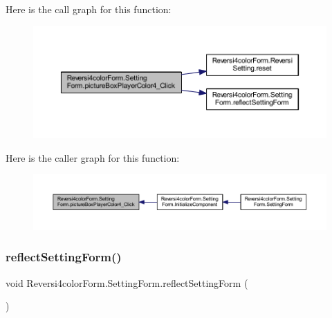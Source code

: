 Here is the call graph for this function\+:
\nopagebreak
\begin{figure}[H]
\begin{center}
\leavevmode
\includegraphics[width=350pt]{class_reversi4color_form_1_1_setting_form_ab63992b26a7b6709437689625b8a1143_cgraph}
\end{center}
\end{figure}
Here is the caller graph for this function\+:
\nopagebreak
\begin{figure}[H]
\begin{center}
\leavevmode
\includegraphics[width=350pt]{class_reversi4color_form_1_1_setting_form_ab63992b26a7b6709437689625b8a1143_icgraph}
\end{center}
\end{figure}
\mbox{\label{class_reversi4color_form_1_1_setting_form_a33a42eed1cef78b8906da8ff65874ecd}} 
\subsubsection{\texorpdfstring{reflect\+Setting\+Form()}{reflectSettingForm()}}
{\footnotesize\ttfamily void Reversi4color\+Form.\+Setting\+Form.\+reflect\+Setting\+Form (\begin{DoxyParamCaption}{ }\end{DoxyParamCaption})\hspace{0.3cm}{\ttfamily [private]}}



